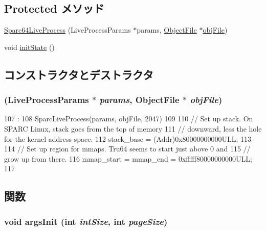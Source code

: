 \subsection*{Protected メソッド}
\begin{DoxyCompactItemize}
\item 
\hyperlink{classSparc64LiveProcess_a4c7f41076cd817d0c075b22537526abb}{Sparc64LiveProcess} (LiveProcessParams $\ast$params, \hyperlink{classObjectFile}{ObjectFile} $\ast$\hyperlink{classLiveProcess_ab6cfcfa7903c66267b3e0351c3caa809}{objFile})
\item 
void \hyperlink{classSparc64LiveProcess_a3c34ea9b29f410748d4435a667484924}{initState} ()
\end{DoxyCompactItemize}


\subsection{コンストラクタとデストラクタ}
\hypertarget{classSparc64LiveProcess_a4c7f41076cd817d0c075b22537526abb}{
\subsubsection[{Sparc64LiveProcess}]{ (LiveProcessParams $\ast$ {\em params}, \/  {\bf ObjectFile} $\ast$ {\em objFile})}}
\label{classSparc64LiveProcess_a4c7f41076cd817d0c075b22537526abb}



\begin{DoxyCode}
107                                                                         :
108             SparcLiveProcess(params, objFile, 2047)
109     {
110         // Set up stack. On SPARC Linux, stack goes from the top of memory
111         // downward, less the hole for the kernel address space.
112         stack_base = (Addr)0x80000000000ULL;
113 
114         // Set up region for mmaps.  Tru64 seems to start just above 0 and
115         // grow up from there.
116         mmap_start = mmap_end = 0xfffff80000000000ULL;
117     }

\end{DoxyCode}


\subsection{関数}
\hypertarget{classSparc64LiveProcess_a60e5314ffeede1e51c6bcb2cf606ca92}{
\subsubsection[{argsInit}]{\setlength{\rightskip}{0pt plus 5cm}void argsInit (int {\em intSize}, \/  int {\em pageSize})}}
\label{classSparc64LiveProcess_a60e5314ffeede1e51c6bcb2cf606ca92}



